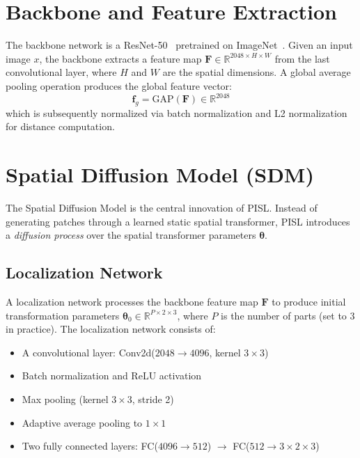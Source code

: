 \section{Backbone and Feature Extraction}

The backbone network is a ResNet-50~\cite{he2016deep} pretrained on ImageNet~\cite{deng2009imagenet}. Given an input image $x$, the backbone extracts a feature map $\mathbf{F} \in \mathbb{R}^{2048 \times H \times W}$ from the last convolutional layer, where $H$ and $W$ are the spatial dimensions. A global average pooling operation produces the global feature vector:
\begin{equation}
    \mathbf{f}_g = \text{GAP}(\mathbf{F}) \in \mathbb{R}^{2048}
\end{equation}
which is subsequently normalized via batch normalization and L2 normalization for distance computation.

\section{Spatial Diffusion Model (SDM)}
\label{sec:sdm}

The Spatial Diffusion Model is the central innovation of PISL. Instead of generating patches through a learned static spatial transformer, PISL introduces a \textit{diffusion process} over the spatial transformer parameters $\boldsymbol{\theta}$.

\subsection{Localization Network}

A localization network processes the backbone feature map $\mathbf{F}$ to produce initial transformation parameters $\boldsymbol{\theta}_0 \in \mathbb{R}^{P \times 2 \times 3}$, where $P$ is the number of parts (set to 3 in practice). The localization network consists of:
\begin{itemize}
    \item A convolutional layer: Conv2d($2048 \rightarrow 4096$, kernel $3 \times 3$)
    \item Batch normalization and ReLU activation
    \item Max pooling (kernel $3 \times 3$, stride 2)
    \item Adaptive average pooling to $1 \times 1$
    \item Two fully connected layers: FC($4096 \rightarrow 512$) $\rightarrow$ FC($512 \rightarrow 3 \times 2 \times 3$)
\end{itemize}

